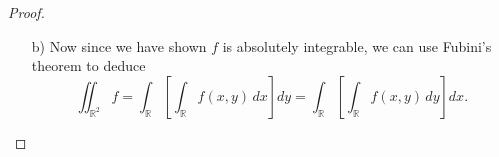 \begin{proof}
\begin{itemize}
\[        \]
        Now we can apply monotone convergence theorem to \(\left\{ h_n \right\} \) since each \(h_n\) is absolutely integrable by doing Fubini's theorem on \(g_n\). Thus, we have 
        \[
            \sup _n \int _{\mathbb{R} } h_n(x) \, \mathrm{d} x = \int _{\mathbb{R} } \sup _n h_n(x) \, \mathrm{d} x = \int _{\mathbb{R} } h(x) \, \mathrm{d} x = \int _{\mathbb{R} } \left( \int _{\mathbb{R} } g(x, y) \, \mathrm{d} y  \right) \, \mathrm{d} x.     
        \]  
        Now since 
        \[
            \int _{\mathbb{R} } h_n(x) \, \mathrm{d} x = \int _{\mathbb{R} } \left( \int _{\mathbb{R} } g_n(x, y) \, \mathrm{d} y  \right) \, \mathrm{d} x \underset{\text{[Fubini]}}{=} \iint _{\mathbb{R} ^2} g_n(x, y),   
        \]
        we have 
        \[
            \sup _n \int _{\mathbb{R} } h_n(x) \, \mathrm{d} x = \sup _n \iint _{\mathbb{R} ^2} g_n(x, y) = \iint _{\mathbb{R} ^2} \sup _n g_n(x, y) = \iint _{\mathbb{R} ^2} g(x, y)  
        \]
        by monotone convergence theorem again. Thus, we have 
        \[
            \iint_{\mathbb{R} ^2} g(x, y) = \sup _n \int _{\mathbb{R} } h_n(x) \, \mathrm{d} x = \int _{\mathbb{R} } \left( \int _{\mathbb{R} } g(x, y) \, \mathrm{d} y  \right) \, \mathrm{d} x.   
        \]
        Now interchange the role of \(x, y\) and do similar proof, we  have 
        \[
            \iint_{\mathbb{R} ^2} g(x, y) = \int _{\mathbb{R} } \left( \int _{\mathbb{R} } g(x, y) \, \mathrm{d} x  \right) \, \mathrm{d} y.   
        \] 
        Hence, the claim is proved. 

        Now since we know one of the two iterated integrals 
        \[
            \int_{\mathbb{R}}
            \left[
            \int_{\mathbb{R}} |f(x,y)|\,dx
            \right]dy
            \qquad\text{or}\qquad
            \int_{\mathbb{R}}
            \left[
            \int_{\mathbb{R}} |f(x,y)|\,dy
            \right]dx
        \]
        exists, and by the claim:
        \[
            \iint _{\mathbb{R} ^2} \vert f(x, y) \vert  = \int _{\mathbb{R} } \left( \int _{\mathbb{R} } \vert f(x, y) \vert  \, \mathrm{d} x  \right) \, \mathrm{d} y = \int _{\mathbb{R} } \left( \int _{\mathbb{R} } \vert f(x, y) \vert \, \mathrm{d} y  \right) \, \mathrm{d} x,   
        \]
        we can conclude that 
        \[
            \iint_{\mathbb{R} ^2} \vert f(x, y) \vert  
        \]
        exists, so \(f \in L(\mathbb{R} ^2)\). 
        \item [b)] Now since we have shown \(f\) is absolutely integrable, we can use Fubini's theorem to deduce 
        \[
            \iint_{\mathbb{R}^2} f
            =
            \int_{\mathbb{R}}
            \left[
            \int_{\mathbb{R}} f(x,y)\,dx
            \right]dy
            =
            \int_{\mathbb{R}}
            \left[
            \int_{\mathbb{R}} f(x,y)\,dy
            \right]dx.
        \]
    \end{itemize}
\end{proof}

